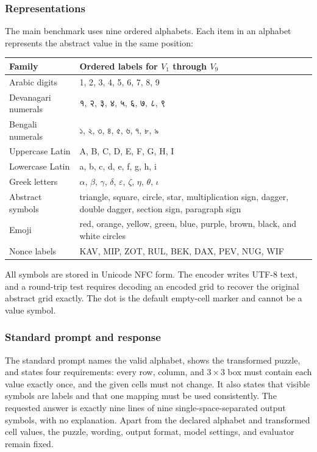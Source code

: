\documentclass[11pt,a4paper]{article}
\begin{document}
\subsubsection{Representations}
The main benchmark uses nine ordered alphabets.  Each item in an alphabet represents the abstract value in the same position:
\begin{center}
\small
\begin{tabularx}{\linewidth}{@{}lX@{}}
\toprule
Family & Ordered labels for $V_1$ through $V_9$ \\
\midrule
Arabic digits & 1, 2, 3, 4, 5, 6, 7, 8, 9 \\
Devanagari numerals & {\devanagarifont १, २, ३, ४, ५, ६, ७, ८, ९} \\
Bengali numerals & {\banglafont ১, ২, ৩, ৪, ৫, ৬, ৭, ৮, ৯} \\
Uppercase Latin & A, B, C, D, E, F, G, H, I \\
Lowercase Latin & a, b, c, d, e, f, g, h, i \\
Greek letters & $\alpha$, $\beta$, $\gamma$, $\delta$, $\varepsilon$, $\zeta$, $\eta$, $\theta$, $\iota$ \\
Abstract symbols & triangle, square, circle, star, multiplication sign, dagger, double dagger, section sign, paragraph sign \\
Emoji & red, orange, yellow, green, blue, purple, brown, black, and white circles \\
Nonce labels & KAV, MIP, ZOT, RUL, BEK, DAX, PEV, NUG, WIF \\
\bottomrule
\end{tabularx}
\end{center}
All symbols are stored in Unicode NFC form.  The encoder writes UTF-8 text, and a round-trip test requires decoding an encoded grid to recover the original abstract grid exactly.  The dot is the default empty-cell marker and cannot be a value symbol.

\subsubsection{Standard prompt and response}
The standard prompt names the valid alphabet, shows the transformed puzzle, and states four requirements: every row, column, and $3\times3$ box must contain each value exactly once, and the given cells must not change.  It also states that visible symbols are labels and that one mapping must be used consistently.  The requested answer is exactly nine lines of nine single-space-separated output symbols, with no explanation.  Apart from the declared alphabet and transformed cell values, the puzzle, wording, output format, model settings, and evaluator remain fixed.
\end{document}
